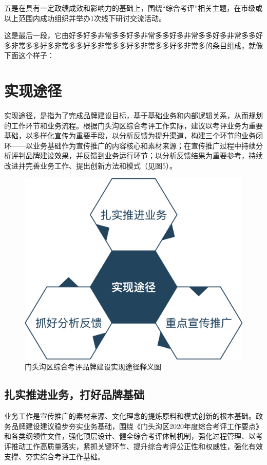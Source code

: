 \documentclass[12pt]{article} %
\begin{document}
五是在具有一定政绩成效和影响力的基础上，围绕“综合考评”相关主题，在市级或以上范围内成功组织并举办1次线下研讨交流活动。


这是最后一段，它由好多好多非常多多好多非常多多好多非常多多好多非常多多好多非常多多好多非常多多好多非常多多好多非常多多好多非常多的条目组成，就像下面这个样子：

\section{实现途径}
实现途径，是指为了完成品牌建设目标，基于基础业务和内部逻辑关系，从而规划的工作环节和业务流程。根据门头沟区综合考评工作实际，建议以考评业务为重要基础，以多样化宣传为重要手段，以分析反馈为提升渠道，构建三个环节的业务闭环——以业务基础作为宣传推广的内容核心和素材来源；在宣传推广过程中持续分析评判品牌建设效果，并反馈到业务运行环节；以分析反馈结果为重要参考，持续改进并完善业务工作、提出创新方法和模式（见图5）。
\begin{figure}[ht]
\centering
\includegraphics[width=\textwidth]{figures/5.png}
\caption{门头沟区综合考评品牌建设实现途径释义图}
\label{fig:fig1}
\end{figure}

\subsection{扎实推进业务，打好品牌基础}
业务工作是宣传推广的素材来源、文化理念的提炼原料和模式创新的根本基础。政务品牌建设建议稳步夯实业务基础，围绕《门头沟区2020年度综合考评工作要点》和各类纲领性文件，强化顶层设计、健全综合考评体制机制，强化过程管理、以考评推动工作高质量落实，紧抓关键环节、提升综合考评公正性和权威性，强化有效支撑、夯实综合考评工作基础。
\end{document}

